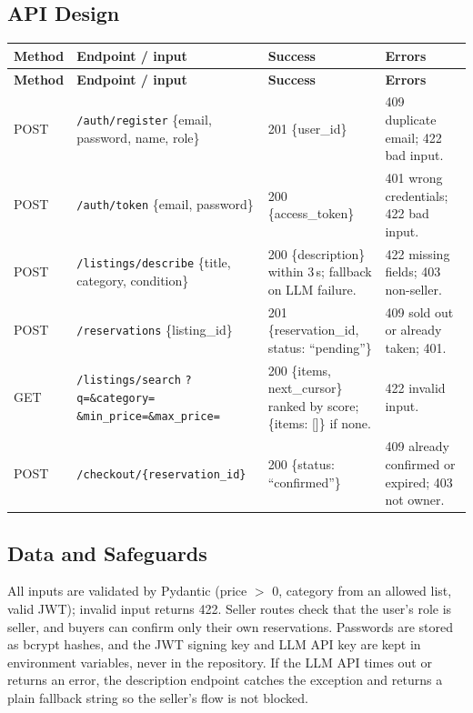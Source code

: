 \documentclass[11pt]{article}
\begin{document}
\subsection*{API Design}
{\small
\begin{xltabular}{\linewidth}{@{}P{1.1cm}P{4.3cm}P{3.6cm}L@{}}
\toprule
\textbf{Method} & \textbf{Endpoint / input} & \textbf{Success} & \textbf{Errors} \\
\midrule
\endfirsthead
\toprule
\textbf{Method} & \textbf{Endpoint / input} & \textbf{Success} & \textbf{Errors} \\
\midrule
\endhead
POST & \texttt{/auth/register} \{email, password, name, role\} & 201 \{user\_id\} & 409 duplicate email; 422 bad input. \\
POST & \texttt{/auth/token} \{email, password\} & 200 \{access\_token\} & 401 wrong credentials; 422 bad input. \\
POST & \texttt{/listings/describe} \{title, category, condition\} & 200 \{description\} within 3\,s; fallback on LLM failure. & 422 missing fields; 403 non-seller. \\
POST & \texttt{/reservations} \{listing\_id\} & 201 \{reservation\_id, status: ``pending''\} & 409 sold out or already taken; 401. \\
GET & \texttt{/listings/search} \texttt{?q=\&category=} \texttt{\&min\_price=\&max\_price=} & 200 \{items, next\_cursor\} ranked by score; \{items: []\} if none. & 422 invalid input. \\
POST & \texttt{/checkout/}\newline\texttt{\{reservation\_id\}} & 200 \{status: ``confirmed''\} & 409 already confirmed or expired; 403 not owner. \\
\bottomrule
\end{xltabular}}


\subsection*{Data and Safeguards}
All inputs are validated by Pydantic (price $>$ 0, category from an allowed list, valid JWT);
invalid input returns 422. Seller routes check that the user's role is seller, and buyers can confirm
only their own reservations. Passwords are stored as bcrypt hashes, and the JWT signing key and
LLM API key are kept in environment variables, never in the repository. If the LLM API times out
or returns an error, the description endpoint catches the exception and returns a plain fallback string
so the seller's flow is not blocked.
\end{document}
